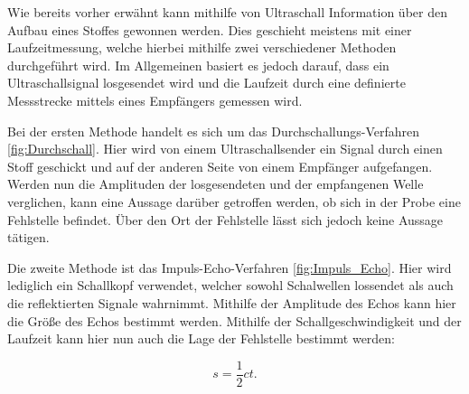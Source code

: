 Wie bereits vorher erwähnt kann mithilfe von Ultraschall Information über
den Aufbau eines Stoffes gewonnen werden. Dies geschieht meistens mit einer
Laufzeitmessung, welche hierbei mithilfe zwei verschiedener Methoden durchgeführt
wird. Im Allgemeinen basiert es jedoch darauf, dass ein Ultraschallsignal
losgesendet wird und die Laufzeit durch eine definierte Messstrecke mittels eines
Empfängers gemessen wird.

Bei der ersten Methode handelt es sich um das Durchschallungs-Verfahren
\ref{fig:Durchschall}. Hier
wird von einem Ultraschallsender ein Signal durch einen Stoff geschickt und auf
der anderen Seite von einem Empfänger aufgefangen. Werden nun die Amplituden der
losgesendeten und der empfangenen Welle verglichen, kann eine Aussage darüber
getroffen werden, ob sich in der Probe eine Fehlstelle befindet. Über den Ort der
Fehlstelle lässt sich jedoch keine Aussage tätigen.

Die zweite Methode ist das Impuls-Echo-Verfahren \ref{fig:Impuls_Echo}.
Hier wird lediglich ein Schallkopf
verwendet, welcher sowohl Schalwellen lossendet als auch die reflektierten Signale
wahrnimmt. Mithilfe der Amplitude des Echos kann hier die Größe des Echos bestimmt
werden. Mithilfe der Schallgeschwindigkeit und der Laufzeit kann hier nun auch
die Lage der Fehlstelle bestimmt werden:

\begin{equation}
  s = \frac{1}{2} c t.
  \label{eqn:Fehlstelle}
\end{equation}

